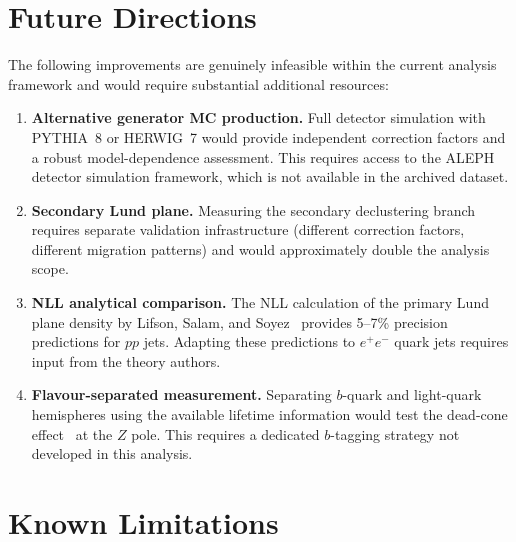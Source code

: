 \documentclass[11pt,a4paper]{article}
\begin{document}
\section{Future Directions}
\label{sec:future}

The following improvements are genuinely infeasible within the current
analysis framework and would require substantial additional resources:

\begin{enumerate}
\item \textbf{Alternative generator MC production.}  Full detector
  simulation with PYTHIA~8 or HERWIG~7 would provide independent
  correction factors and a robust model-dependence assessment.  This
  requires access to the ALEPH detector simulation framework, which
  is not available in the archived dataset.
\item \textbf{Secondary Lund plane.}  Measuring the secondary
  declustering branch requires separate validation infrastructure
  (different correction factors, different migration patterns) and
  would approximately double the analysis scope.
\item \textbf{NLL analytical comparison.}  The NLL calculation of
  the primary Lund plane density by Lifson, Salam, and
  Soyez~\cite{Lifson:2020gua} provides 5--7\% precision predictions
  for $pp$ jets.  Adapting these predictions to $e^+e^-$ quark jets
  requires input from the theory authors.
\item \textbf{Flavour-separated measurement.}  Separating $b$-quark
  and light-quark hemispheres using the available lifetime information
  would test the dead-cone effect~\cite{LHCb:2025viq} at the $Z$ pole.
  This requires a dedicated $b$-tagging strategy not developed in this
  analysis.
\end{enumerate}

\section{Known Limitations}
\label{sec:limitations}
\end{document}
